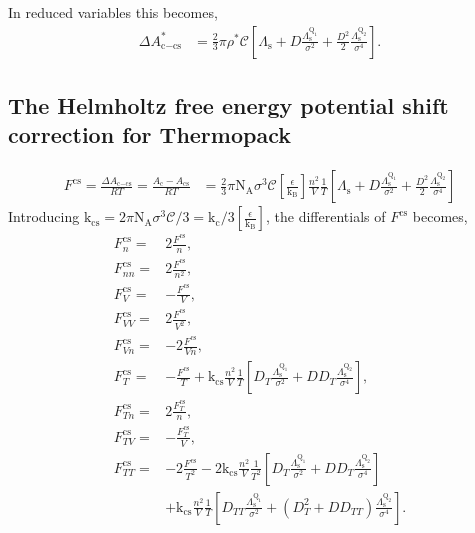 \documentclass[english]{../thermomemo/thermomemo}
\newcommand*{\lb}{\left(}
\newcommand*{\rb}{\right)}
\newcommand{\NA}{\ensuremath{\text{N}_{\text{A}}}\xspace}
\newcommand{\KB}{\ensuremath{\text{k}_{\text{B}}}\xspace}
\newcommand{\cut}{\ensuremath{\text{c}}\xspace}
\newcommand{\cs}{\ensuremath{\text{cs}}\xspace}
\newcommand{\shift}{\ensuremath{\text{s}}\xspace}
\newcommand{\Qone}{\ensuremath{\text{Q}_1}\xspace}
\newcommand{\Qtwo}{\ensuremath{\text{Q}_2}\xspace}
\newcommand{\kF}{\ensuremath{\text{k}_\text{c}}\xspace}
\newcommand{\kC}{\ensuremath{\text{k}_\text{cs}}\xspace}
\begin{document}
In reduced variables this becomes,
\begin{align}
  \label{eq:i_mie_shift_star}
  \Delta A_{\cut-\cs}^*  &= \frac{2}{3} \pi \rho^* \mathcal{C} \left[\Lambda_\shift
                         + D \frac{\Lambda_\shift^{\Qone}}{\sigma^2}
                         + \frac{D^2}{2} \frac{\Lambda_\shift^{\Qtwo}}{\sigma^4}\right].
\end{align}

\subsection{The Helmholtz free energy potential shift correction for Thermopack}
\begin{align}
  \label{eq:dAcs_RT}
  F^\cs = \frac{\Delta A_{\cut-\cs}}{R T} = \frac{A_\cut - A_\cs}{R T} &= \frac{2}{3} \pi \NA \sigma^3 \mathcal{C} \left[\frac{\epsilon}{\KB}\right] \frac{n^2}{V} \frac{1}{T} \left[ \Lambda_\shift + D \frac{\Lambda_\shift^{\Qone}}{\sigma^2}
    + \frac{D^2}{2} \frac{\Lambda_\shift^{\Qtwo}}{\sigma^4} \right]
\end{align}
Introducing $\kC = 2 \pi \NA \sigma^3 \mathcal{C}/3 = \kF/3
\left[\frac{\epsilon}{\KB}\right]$, the differentials of $F^\cs$ becomes,
\begin{align}
  \label{eq:dFcs}
  F^\cs_n =& 2 \frac{F^\cs}{n}, \\
  F^\cs_{nn} =& 2 \frac{F^\cs}{n^2}, \\
  F^\cs_{V} =& - \frac{F^\cs}{V}, \\
  F^\cs_{VV} =& 2 \frac{F^\cs}{V^2}, \\
  F^\cs_{Vn} =&  -2 \frac{F^\cs}{V n}, \\
  F^\cs_{T} =& - \frac{F^\cs}{T} + \kC \frac{n^2}{V} \frac{1}{T} \left[ D_{T} \frac{\Lambda_\shift^{\Qone}}{\sigma^2}
    + D D_{T} \frac{\Lambda_\shift^{\Qtwo}}{\sigma^4} \right], \\
  F^\cs_{Tn} =&  2 \frac{F^\cs_T}{n}, \\
  F^\cs_{TV} =&  - \frac{F^\cs_T}{V}, \\
  F^\cs_{TT} =& - 2 \frac{F^\cs}{T^2} -  2 \kC \frac{n^2}{V} \frac{1}{T^2} \left[ D_{T} \frac{\Lambda_\shift^{\Qone}}{\sigma^2}
    + D D_{T} \frac{\Lambda_\shift^{\Qtwo}}{\sigma^4} \right]  \nonumber \\ & + \kC \frac{n^2}{V} \frac{1}{T} \left[ D_{TT} \frac{\Lambda_\shift^{\Qone}}{\sigma^2} +
    \lb D_{T}^2 + D D_{TT} \rb \frac{\Lambda_\shift^{\Qtwo}}{\sigma^4} \right].
\end{align}
\clearpage


\end{document}
